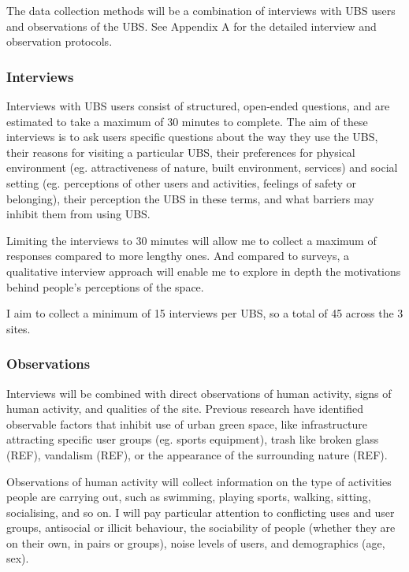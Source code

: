 \documentclass{article}
\begin{document}
The data collection methods will be a combination of interviews with UBS users and observations of the UBS. See Appendix A for the detailed interview and observation protocols.

\subsubsection{Interviews}

Interviews with UBS users consist of structured, open-ended questions, and are estimated to take a maximum of 30 minutes to complete. The aim of these interviews is to ask users specific questions about the way they use the UBS, their reasons for visiting a particular UBS, their preferences for physical environment (eg. attractiveness of nature, built environment, services) and  social setting (eg. perceptions of other users and activities, feelings of safety or belonging), their perception the UBS in these terms, and what barriers may inhibit them from using UBS.

Limiting the interviews to 30 minutes will allow me to collect a maximum of responses compared to more lengthy ones. And compared to surveys, a qualitative interview approach will enable me to explore in depth the motivations behind people's perceptions of the space.

I aim to collect a minimum of 15 interviews per UBS, so a total of 45 across the 3 sites.

\subsubsection{Observations}

Interviews will be combined with direct observations of human activity, signs of human activity, and qualities of the site. Previous research have identified observable factors that inhibit use of urban green space, like infrastructure attracting specific user groups (eg. sports equipment), trash like broken glass (REF), vandalism (REF), or the appearance of the surrounding nature (REF).

Observations of human activity will collect information on the type of activities people are carrying out, such as swimming, playing sports, walking, sitting, socialising, and so on. I will pay particular attention to conflicting uses and user groups, antisocial or illicit behaviour, the sociability of people (whether they are on their own, in pairs or groups), noise levels of users, and demographics (age, sex).
\end{document}

